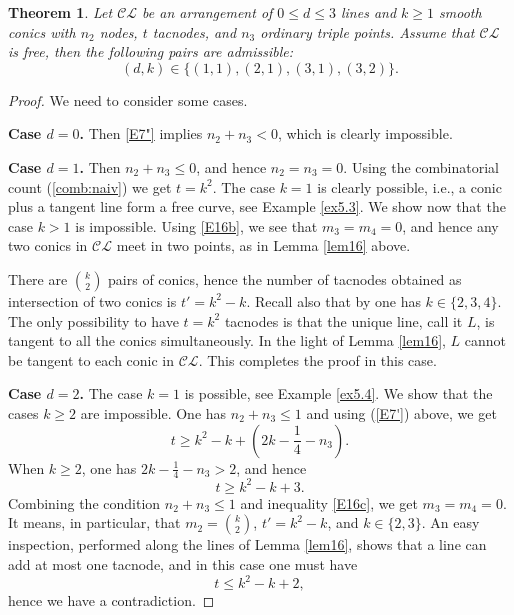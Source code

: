 \documentclass[12pt]{amsart}
\theoremstyle{plain}
\newtheorem{thm}[subsection]{Theorem}
\theoremstyle{definition}
\numberwithin{equation}{section}
\begin{document}
\begin{thm}
\label{thm1}
Let $\mathcal{CL}$ be an arrangement of $0 \leq d \leq 3$ lines and $k \geq 1$ smooth conics with $n_2$ nodes, $t$ tacnodes, and $n_3$ ordinary triple points. Assume that  $\mathcal{CL}$  is free, then the following pairs are admissible: $$(d,k) \in \{(1,1), (2,1), (3,1), (3,2)\}.$$
\end{thm}
\begin{proof}
We need to consider some cases.


{\bf Case $d=0$.} Then \eqref{E7"} implies $n_2+n_3 < 0$, which is clearly impossible.

{\bf Case $d=1$.}  Then $n_2+n_3 \leq 0$, and hence $n_2=n_3=0$.
Using the combinatorial count (\ref{comb:naiv}) we get $t=k^2$. The case $k=1$ is clearly possible, i.e., a conic plus a tangent line form a free curve, see Example \ref{ex5.3}. We show now that the case $k > 1$ is impossible. Using \eqref{E16b}, we see that $m_3=m_4=0$, and hence any two conics in $\mathcal{CL}$ meet in two points, as in Lemma \ref{lem16} above.

There are $\binom{k}{2}$ pairs of conics, hence the number of tacnodes obtained as intersection of two conics is $t'=k^2-k$. Recall also that by \cite{DJP} one has $k \in \{2,3,4\}$. The only possibility to have $t=k^2$ tacnodes is that the unique line, call it  $L$, is tangent to all the conics simultaneously. In the light of Lemma \ref{lem16}, $L$ cannot be tangent to each conic in $\mathcal{CL}$. This completes the proof in this case.


{\bf Case $d=2$.} The case $k=1$ is possible, see Example \ref{ex5.4}. We show that the cases $k \geq 2$ are impossible. One has  $n_2+n_3 \leq 1$ and using (\ref{E7'}) above, we get
$$t \geq k^2-k+(2k-\frac{1}{4}-n_3).$$
When $k \geq 2$, one has $2k-\frac{1}{4}-n_3 >2$, and hence
$$t \geq k^2-k+3.$$
Combining the condition $n_{2} + n_{3} \leq 1$ and inequality \eqref{E16c}, we get $m_3 = m_4 =0$. It means, in particular, that $m_{2} = \binom{k}{2}$, $t' = k^{2} - k$, and $k \in \{2,3\}$. An easy inspection, performed along the lines of Lemma \ref{lem16}, shows that a line can add at most one tacnode, and in this case one must have 
$$t \leq k^2-k+2,$$
hence we have a contradiction.


\end{proof}
\end{document}
